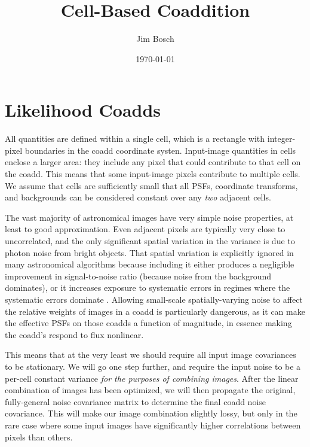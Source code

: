 \documentclass[DM,authoryear,toc]{lsstdoc}
\title{Cell-Based Coaddition}
\author{%
Jim Bosch
}
\date{\today}
\begin{document}
\maketitle

\section{Likelihood Coadds}

All quantities are defined within a single cell, which is a rectangle with integer-pixel boundaries in the coadd coordinate systen.
Input-image quantities in cells enclose a larger area: they include any pixel that could contribute to that cell on the coadd.
This means that some input-image pixels contribute to multiple cells.
We assume that cells are sufficiently small that all PSFs, coordinate transforms, and backgrounds can be considered constant over any \emph{two} adjacent cells.

The vast majority of astronomical images have very simple noise properties, at least to good approximation.
Even adjacent pixels are typically very close to uncorrelated, and the only significant spatial variation in the variance is due to photon noise from bright objects.
That spatial variation is explicitly ignored in many astronomical algorithms because including it either produces a negligible improvement in signal-to-noise ratio (because noise from the background dominates), or it increases exposure to systematic errors in regimes where the systematic errors dominate \citep[e.g. PSF photometry of bright stars;][]{2018PASJ...70S...5B}.
Allowing small-scale spatially-varying noise to affect the relative weights of images in a coadd is particularly dangerous, as it can make the effective PSFs on those coadds a function of magnitude, in essence making the coadd's respond to flux nonlinear.

This means that at the very least we should require all input image covariances to be stationary.
We will go one step further, and require the input noise to be a per-cell constant variance \emph{for the purposes of combining images}.
After the linear combination of images has been optimized, we will then propagate the original, fully-general noise covariance matrix to determine the final coadd noise covariance.
This will make our image combination slightly lossy, but only in the rare case where some input images have significantly higher correlations between pixels than others.
\end{document}
